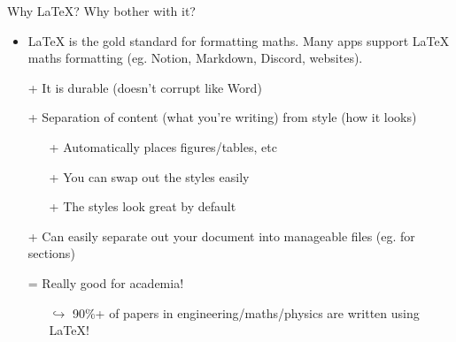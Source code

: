 \documentclass{beamer}
\begin{document}
\begin{frame}[fragile]{Why \LaTeX{}? Why bother with it?}
    \begin{itemize}
        \item \LaTeX{} is the gold standard for formatting maths. Many apps support LaTeX maths formatting (eg. Notion, Markdown, Discord, websites).
        \item[+] It is durable (doesn't corrupt like Word)
        \item[+] Separation of content (what you're writing) from style (how it looks)
        \begin{itemize}
            \item[+] Automatically places figures/tables, etc
            \item[+] You can swap out the styles easily
            \item[+] The styles look great by default
        \end{itemize}
        \item[+] Can easily separate out your document into manageable files (eg. for sections) 
        \item[=] Really good for academia!
        \begin{itemize} 
            \item[$\hookrightarrow{}$] 90\%+ of papers in engineering/maths/physics are written using LaTeX!
        \end{itemize} 
    
    \end{itemize}
\end{frame}
\end{document}
